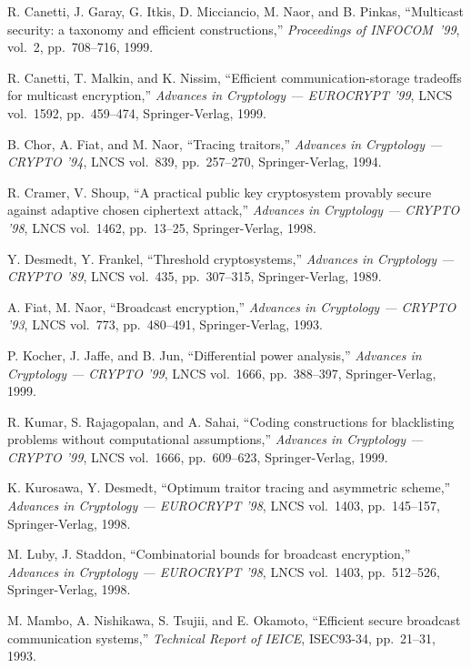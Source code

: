 \documentclass{ims9x6}
\begin{document}
\begin{thebibliography}{00}
 R. Canetti, J. Garay, G. Itkis, D. Micciancio,
M. Naor, and B. Pinkas, ``Multicast security: a taxonomy and efficient
constructions,'' {\em Proceedings of \hbox{INFOCOM~'99}}, vol.~2,
pp.~708--716, 1999.

 R. Canetti, T. Malkin, and K. Nissim, ``Efficient
communication-storage tradeoffs for multicast encryption,''
{\em Advances in Cryptology --- EUROCRYPT '99}, LNCS vol.~1592,
pp.~459--474, Springer-Verlag, 1999.

 B. Chor, A. Fiat, and M. Naor, ``Tracing traitors,''
{\em Advances in Cryptology --- CRYPTO '94}, LNCS vol.~839,
pp.~257--270, Springer-Verlag, 1994.

 R. Cramer, V. Shoup, ``A practical public key
cryptosystem provably secure against adaptive chosen ciphertext
attack,'' {\em Advances in Cryptology --- CRYPTO '98}, LNCS vol.~1462,
pp.~13--25, Springer-Verlag, 1998.

 Y. Desmedt, Y. Frankel, ``Threshold cryptosystems,''
{\em Advances in Cryptology --- CRYPTO '89}, LNCS vol.~435,
pp.~307--315, Springer-Verlag, 1989.

 A. Fiat, M. Naor, ``Broadcast encryption,'' {\em
Advances in Cryptology --- CRYPTO '93}, LNCS vol.~773, pp.~480--491,
Springer-Verlag, 1993.

 P. Kocher, J. Jaffe, and B. Jun, ``Differential power
analysis,'' {\em Advances in Cryptology --- CRYPTO '99}, LNCS
vol.~1666, pp.~388--397, Springer-Verlag, 1999.

 R. Kumar, S. Rajagopalan, and A. Sahai, ``Coding
constructions for blacklisting problems without computational
assumptions,'' {\em Advances in Cryptology --- CRYPTO '99}, LNCS
vol.~1666, pp.~609--623, Springer-Verlag, 1999.

 K. Kurosawa, Y. Desmedt, ``Optimum traitor tracing
and asymmetric scheme,'' {\em Advances in Cryptology --- EUROCRYPT
'98}, LNCS vol.~1403, pp.~145--157, Springer-Verlag, 1998.

 M. Luby, J. Staddon, ``Combinatorial bounds for
broadcast encryption,'' {\em Advances in Cryptology --- EUROCRYPT
'98}, LNCS vol.~1403, pp.~512--526, Springer-Verlag, 1998.

 M. Mambo, A. Nishikawa, S. Tsujii, and E. Okamoto,
``Efficient secure broadcast communication systems,''
{\em Technical Report of IEICE}, ISEC93-34, pp.~21--31, 1993.


\end{thebibliography}
\end{document}
